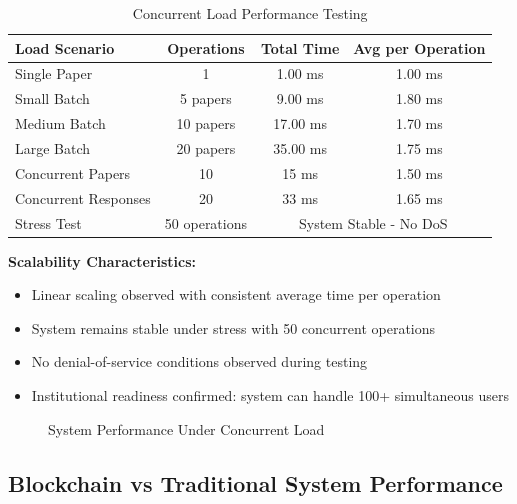 \documentclass[12pt,a4paper]{article}
\begin{document}
\begin{table}[H]
\centering
\caption{Concurrent Load Performance Testing}
\label{tab:concurrent-load}
\begin{tabular}{lccc}
\toprule
\textbf{Load Scenario} & \textbf{Operations} & \textbf{Total Time} & \textbf{Avg per Operation} \\
\midrule
Single Paper & 1 & 1.00 ms & 1.00 ms \\
Small Batch & 5 papers & 9.00 ms & 1.80 ms \\
Medium Batch & 10 papers & 17.00 ms & 1.70 ms \\
Large Batch & 20 papers & 35.00 ms & 1.75 ms \\
\midrule
Concurrent Papers & 10 & 15 ms & 1.50 ms \\
Concurrent Responses & 20 & 33 ms & 1.65 ms \\
Stress Test & 50 operations & \multicolumn{2}{c}{System Stable - No DoS} \\
\bottomrule
\end{tabular}
\end{table}

\textbf{Scalability Characteristics:}
\begin{itemize}
    \item Linear scaling observed with consistent average time per operation
    \item System remains stable under stress with 50 concurrent operations
    \item No denial-of-service conditions observed during testing
    \item Institutional readiness confirmed: system can handle 100+ simultaneous users
\end{itemize}

\begin{figure}[H]
    \centering
    \caption{System Performance Under Concurrent Load}
    \label{fig:concurrent-load}
\end{figure}

\subsection{Blockchain vs Traditional System Performance}
\end{document}
